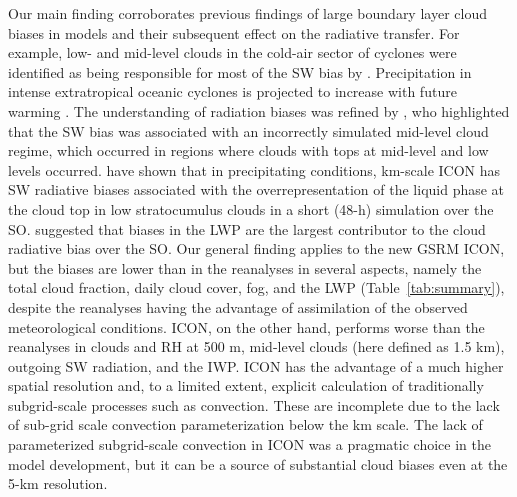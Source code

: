 \documentclass[draft]{agujournal2019}
\begin{document}
Our main finding corroborates previous findings of large boundary layer cloud biases in models and their subsequent effect on the radiative transfer. For example, low- and mid-level clouds in the cold-air sector of cyclones were identified as being responsible for most of the SW bias by . Precipitation in intense extratropical oceanic cyclones is projected to increase with future warming \cite{kodama2019}. The understanding of radiation biases was refined by , who highlighted that the SW bias was associated with an incorrectly simulated mid-level cloud regime, which occurred in regions where clouds with tops at mid-level and low levels occurred.  have shown that in precipitating conditions, km-scale ICON has SW radiative biases associated with the overrepresentation of the liquid phase at the cloud top in low stratocumulus clouds in a short (48-h) simulation over the SO.  suggested that biases in the LWP are the largest contributor to the cloud radiative bias over the SO. Our general finding applies to the new GSRM ICON, but the biases are lower than in the reanalyses in several aspects, namely the total cloud fraction, daily cloud cover, fog, and the LWP (Table~\ref{tab:summary}), despite the reanalyses having the advantage of assimilation of the observed meteorological conditions. ICON, on the other hand, performs worse than the reanalyses in clouds and RH at 500 m, mid-level clouds (here defined as 1.5 km), outgoing SW radiation, and the IWP. ICON has the advantage of a much higher spatial resolution and, to a limited extent, explicit calculation of traditionally subgrid-scale processes such as convection. These are incomplete due to the lack of sub-grid scale convection parameterization below the km scale. The lack of parameterized subgrid-scale convection in ICON was a pragmatic choice in the model development, but it can be a source of substantial cloud biases even at the 5-km resolution.
\end{document}
